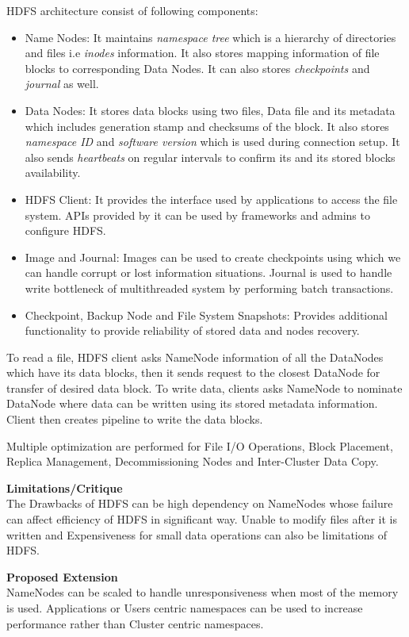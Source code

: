 \documentclass[a4paper, 10pt]{article}
\begin{document}
HDFS architecture consist of following components:
\begin{itemize}
	\item Name Nodes: It maintains \emph{namespace tree} which is a hierarchy of directories and files i.e \emph{inodes} information. It also stores mapping information of file blocks to corresponding Data Nodes. It can also stores \emph{checkpoints} and \emph{journal} as well.
	\item Data Nodes: It stores data blocks using two files, Data file and its metadata which includes generation stamp and checksums of the block. It also stores \emph{namespace ID} and \emph{software version} which is used during connection setup. It also sends \emph{heartbeats} on regular intervals to confirm its and its stored blocks availability.
	\item HDFS Client: It provides the interface used by applications to access the file system. APIs provided by it can be used by frameworks and admins to configure HDFS.
	\item Image and Journal: Images can be used to create checkpoints using which we can handle corrupt or lost information situations. Journal is used to handle write bottleneck of multithreaded system by performing batch transactions.   
	\item Checkpoint, Backup Node and File System Snapshots: Provides additional functionality to provide reliability of stored data and nodes recovery.  
\end{itemize}
To read a file, HDFS client asks NameNode information of all the DataNodes which have its data blocks, then it sends request to the closest DataNode for transfer of desired data block. To write data, clients asks NameNode to nominate DataNode where data can be written using its stored metadata information. Client then creates pipeline to write the data blocks.

Multiple optimization are performed for File I/O Operations, Block Placement, Replica Management, Decommissioning Nodes and Inter-Cluster Data Copy.

\noindent
\large\textbf{Limitations/Critique}\\
The Drawbacks of HDFS can be high dependency on NameNodes whose failure can affect efficiency of HDFS in significant way. Unable to modify files after it is written and Expensiveness for small data operations can also be limitations of HDFS.

\noindent
\large\textbf{Proposed Extension}\\
NameNodes can be scaled to handle unresponsiveness when most of the memory is used. Applications or Users centric namespaces can be used to increase performance rather than Cluster centric namespaces. 
\end{document}
